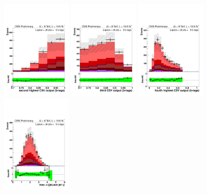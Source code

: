 \begin{figure}[hbtp]
\begin{center}
   \includegraphics[width=0.31\textwidth]{Figures/Analysis_2_Diagrams/LJ_plots_lep/6j3t/lep_jet_csv_2_6j3t_cumulative_wRatio_noLegend_lin.pdf}
   \includegraphics[width=0.31\textwidth]{Figures/Analysis_2_Diagrams/LJ_plots_lep/6j3t/lep_jet_csv_3_6j3t_cumulative_wRatio_noLegend_lin.pdf}
   \includegraphics[width=0.31\textwidth]{Figures/Analysis_2_Diagrams/LJ_plots_lep/6j3t/lep_jet_csv_4_6j3t_cumulative_wRatio_noLegend_lin.pdf}
   \includegraphics[width=0.31\textwidth]{Figures/Analysis_2_Diagrams/LJ_plots_lep/6j3t/lep_maxeta_jet_jet_6j3t_cumulative_wRatio_noLegend_lin.pdf}

\end{center}
\end{figure}
